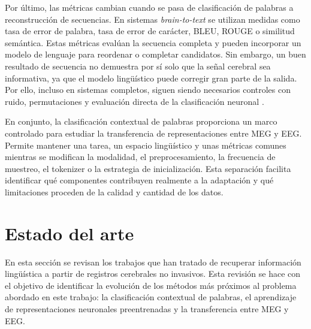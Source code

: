 Por último, las métricas cambian cuando se pasa de clasificación de palabras a reconstrucción de secuencias. En sistemas \textit{brain-to-text} se utilizan medidas como tasa de error de palabra, tasa de error de carácter, BLEU, ROUGE o similitud semántica. Estas métricas evalúan la secuencia completa y pueden incorporar un modelo de lenguaje para reordenar o completar candidatos. Sin embargo, un buen resultado de secuencia no demuestra por sí solo que la señal cerebral sea informativa, ya que el modelo lingüístico puede corregir gran parte de la salida. Por ello, incluso en sistemas completos, siguen siendo necesarios controles con ruido, permutaciones y evaluación directa de la clasificación neuronal \cite{jayalath2025unlocking}.

En conjunto, la clasificación contextual de palabras proporciona un marco controlado para estudiar la transferencia de representaciones entre MEG y EEG. Permite mantener una tarea, un espacio lingüístico y unas métricas comunes mientras se modifican la modalidad, el preprocesamiento, la frecuencia de muestreo, el tokenizer o la estrategia de inicialización. Esta separación facilita identificar qué componentes contribuyen realmente a la adaptación y qué limitaciones proceden de la calidad y cantidad de los datos.

\section{Estado del arte}

En esta sección se revisan los trabajos que han tratado de recuperar información lingüística a partir de registros cerebrales no invasivos. Esta revisión se hace con el objetivo de identificar la evolución de los métodos más próximos al problema abordado en este trabajo: la clasificación contextual de palabras, el aprendizaje de representaciones neuronales preentrenadas y la transferencia entre MEG y EEG.

